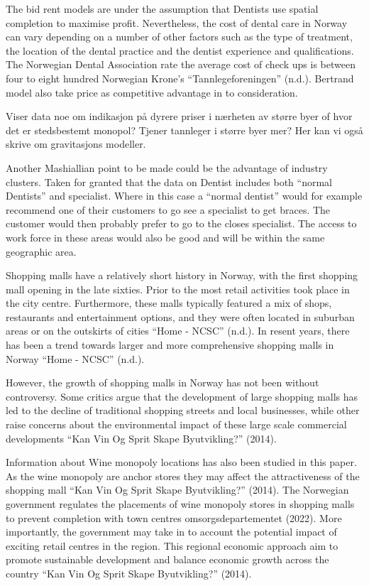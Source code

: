 \documentclass[
  10,
  a4paper,
]{article}
\begin{document}
The bid rent models are under the assumption that Dentists use spatial
completion to maximise profit. Nevertheless, the cost of dental care in
Norway can vary depending on a number of other factors such as the type
of treatment, the location of the dental practice and the dentist
experience and qualifications. The Norwegian Dental Association rate the
average cost of check ups is between four to eight hundred Norwegian
Krone's {``Tannlegeforeningen''} (n.d.). Bertrand model also take price
as competitive advantage in to consideration.

Viser data noe om indikasjon på dyrere priser i nærheten av større byer
of hvor det er stedsbestemt monopol? Tjener tannleger i større byer mer?
Her kan vi også skrive om gravitasjons modeller.

Another Mashiallian point to be made could be the advantage of industry
clusters. Taken for granted that the data on Dentist includes both
``normal Dentists'' and specialist. Where in this case a ``normal
dentist'' would for example recommend one of their customers to go see a
specialist to get braces. The customer would then probably prefer to go
to the closes specialist. The access to work force in these areas would
also be good and will be within the same geographic area.

Shopping malls have a relatively short history in Norway, with the first
shopping mall opening in the late sixties. Prior to the most retail
activities took place in the city centre. Furthermore, these malls
typically featured a mix of shops, restaurants and entertainment
options, and they were often located in suburban areas or on the
outskirts of cities {``Home - NCSC''} (n.d.). In resent years, there has
been a trend towards larger and more comprehensive shopping malls in
Norway {``Home - NCSC''} (n.d.).

However, the growth of shopping malls in Norway has not been without
controversy. Some critics argue that the development of large shopping
malls has led to the decline of traditional shopping streets and local
businesses, while other raise concerns about the environmental impact of
these large scale commercial developments {``Kan Vin Og Sprit Skape
Byutvikling?''} (2014).

Information about Wine monopoly locations has also been studied in this
paper. As the wine monopoly are anchor stores they may affect the
attractiveness of the shopping mall {``Kan Vin Og Sprit Skape
Byutvikling?''} (2014). The Norwegian government regulates the
placements of wine monopoly stores in shopping malls to prevent
completion with town centres omsorgsdepartementet (2022). More
importantly, the government may take in to account the potential impact
of exciting retail centres in the region. This regional economic
approach aim to promote sustainable development and balance economic
growth across the country {``Kan Vin Og Sprit Skape Byutvikling?''}
(2014).
\end{document}
